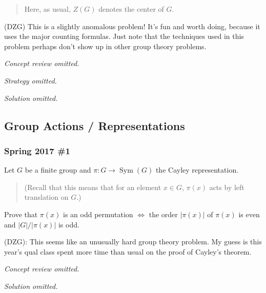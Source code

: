\begin{quote}
Here, as usual, \(Z(G)\) denotes the center of \(G\).
\end{quote}

\begin{warnings}

(DZG) This is a slightly anomalous problem! It's fun and worth doing,
because it uses the major counting formulas. Just note that the
techniques used in this problem perhaps don't show up in other group
theory problems.

\end{warnings}

\emph{Concept review omitted.}

\emph{Strategy omitted.}

\emph{Solution omitted.}

\hypertarget{group-actions-representations}{%
\subsection{Group Actions /
Representations}\label{group-actions-representations}}

\hypertarget{spring-2017-1}{%
\subsubsection{Spring 2017 \#1}\label{spring-2017-1}}

Let \(G\) be a finite group and \(\pi: G\to \operatorname{Sym}(G)\) the
Cayley representation.

\begin{quote}
(Recall that this means that for an element \(x\in G\), \(\pi(x)\) acts
by left translation on \(G\).)
\end{quote}

Prove that \(\pi(x)\) is an odd permutation \(\iff\) the order
\({\left\lvert {\pi(x)} \right\rvert}\) of \(\pi(x)\) is even and
\({\left\lvert {G} \right\rvert} / {\left\lvert {\pi(x)} \right\rvert}\)
is odd.

\begin{warnings}

(DZG): This seems like an unusually hard group theory problem. My guess
is this year's qual class spent more time than usual on the proof of
Cayley's theorem.

\end{warnings}

\emph{Concept review omitted.}

\emph{Solution omitted.}

